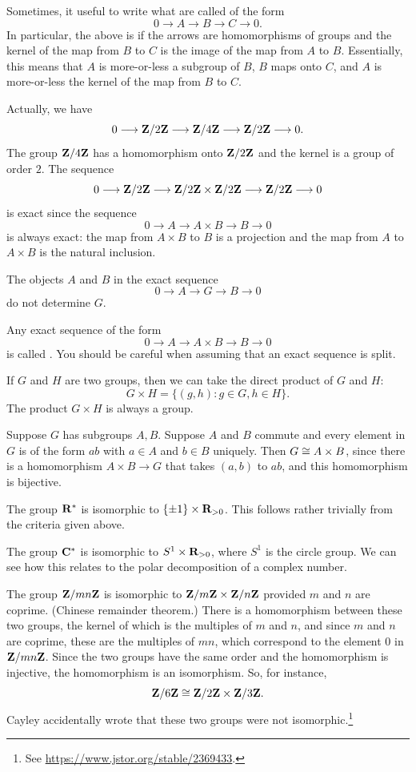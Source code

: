 \documentclass[11pt, oneside]{amsart}
\begin{document}
Sometimes, it useful to write what are called {} of the form
$$
0\longrightarrow A \longrightarrow B\longrightarrow C\longrightarrow 0.
$$
In particular, the above is  if the arrows are homomorphisms of groups and the kernel of the map from $B$ to $C$ is the image of the map from $A$ to $B$. Essentially, this means that $A$ is more-or-less a subgroup of $B$, $B$ maps onto $C$, and $A$ is more-or-less the kernel of the map from $B$ to $C$. 

Actually, we have
$$
0\longrightarrow\mathbf Z/2\mathbf Z \longrightarrow \mathbf Z/4\mathbf Z \longrightarrow \mathbf Z/2\mathbf Z \longrightarrow 0.
$$
The group $\mathbf Z/4\mathbf Z$ has a homomorphism onto $\mathbf Z/2\mathbf Z$ and the kernel is a group of order $2$. The sequence
$$
0\longrightarrow\mathbf Z/2\mathbf Z \longrightarrow \mathbf Z/2\mathbf Z \times \mathbf Z/2\mathbf Z\longrightarrow \mathbf Z/2\mathbf Z \longrightarrow 0
$$
is exact since the sequence 
$$
0\longrightarrow A\longrightarrow A\times B \longrightarrow B\longrightarrow 0
$$
is always exact: the map from $A\times B$ to $B$ is a projection and the map from $A$ to $A\times B$ is the natural inclusion.
\begin{warning}
The objects $A$ and $B$ in the exact sequence
$$
0 \longrightarrow A \longrightarrow G\longrightarrow B \longrightarrow 0
$$
do not determine $G$.
\end{warning}

Any exact sequence of the form 
$$
0\longrightarrow A\longrightarrow A\times B \longrightarrow B\longrightarrow 0
$$
is called . You should be careful when assuming that an exact sequence is split.

If $G$ and $H$ are two groups, then we can take the direct product of $G$ and $H$:
$$
G\times H = \{ (g,h) : g\in G,h\in H\}.
$$
The product $G\times H$ is always a group.

Suppose $G$ has subgroups $A,B$. Suppose $A$ and $B$ commute and every element in $G$ is of the form $ab$ with $a\in A$ and $b\in B$ uniquely. Then $G\cong A\times B$, since there is a homomorphism $A\times B\longrightarrow G$ that takes $(a,b)$ to $ab$, and this homomorphism is bijective. 

The group $\mathbf R^*$ is isomorphic to $\{\pm 1\} \times \mathbf R_{>0}$. This follows rather trivially from the criteria given above.

The group $\mathbf C^*$ is isomorphic to $S^1 \times \mathbf R_{>0}$, where $S^1$ is the circle group. We can see how this relates to the polar decomposition of a complex number.

The group $\mathbf Z/mn\mathbf Z$ is isomorphic to $\mathbf Z/m\mathbf Z\times \mathbf Z/n\mathbf Z$ provided $m$ and $n$ are coprime. ({Chinese remainder theorem}.) There is a homomorphism between these two groups, the kernel of which is the multiples of $m$ and $n$, and since $m$ and $n$ are coprime, these are the multiples of $mn$, which correspond to the element $0$ in $\mathbf Z/mn\mathbf Z$. Since the two groups have the same order and the homomorphism is injective, the homomorphism is an isomorphism. So, for instance, 
$$
\mathbf Z/6\mathbf Z \cong \mathbf Z/2\mathbf Z \times \mathbf Z/3\mathbf Z.
$$
Cayley {accidentally wrote that these two groups were not isomorphic}.\footnote{See \url{https://www.jstor.org/stable/2369433}.}
\end{document}
